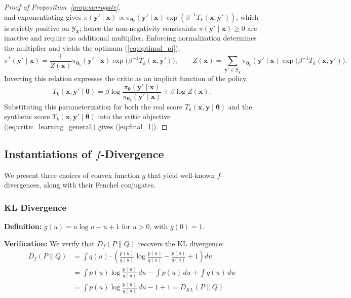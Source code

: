\begin{proof}[Proof of Proposition~\ref{prop:surrogate}]
\[\]
and exponentiating gives $\pi(\boldsymbol{y}'\mid\boldsymbol{x})\propto\pi_{\boldsymbol{\theta}_{k}}(\boldsymbol{y}'\mid\boldsymbol{x})\exp(\beta^{-1}T_{k}(\boldsymbol{x},\boldsymbol{y}'))$, which is strictly positive on $\mathcal{Y}_{\boldsymbol{x}}$; hence the non-negativity constraints $\pi(\boldsymbol{y}'\mid\boldsymbol{x})\ge0$ are inactive and require no additional multiplier. Enforcing normalization determines the multiplier and yields the optimum (\ref{eq:optimal_pi}),
\[
\pi^{*}(\boldsymbol{y}'\mid\boldsymbol{x})=\frac{1}{Z(\boldsymbol{x})}\pi_{\boldsymbol{\theta}_{k}}(\boldsymbol{y}'\mid\boldsymbol{x})\exp\!\big(\beta^{-1}T_{k}(\boldsymbol{x},\boldsymbol{y}')\big),
\qquad
Z(\boldsymbol{x})=\sum_{\boldsymbol{y}'\in\mathcal{Y}_{\boldsymbol{x}}}\pi_{\boldsymbol{\theta}_{k}}(\boldsymbol{y}'\mid\boldsymbol{x})\exp\!\big(\beta^{-1}T_{k}(\boldsymbol{x},\boldsymbol{y}')\big).
\]
Inverting this relation expresses the critic as an implicit function of the policy,
\[
T_{k}(\boldsymbol{x},\boldsymbol{y}'\mid\boldsymbol{\theta})
=\beta\log\frac{\pi_{\boldsymbol{\theta}}(\boldsymbol{y}'\mid\boldsymbol{x})}{\pi_{\boldsymbol{\theta}_{k}}(\boldsymbol{y}'\mid\boldsymbol{x})}+\beta\log Z(\boldsymbol{x}).
\]
Substituting this parameterization for both the real score $T_{k}(\boldsymbol{x},\boldsymbol{y}\mid\boldsymbol{\theta})$ and the synthetic score $T_{k}(\boldsymbol{x},\boldsymbol{y}'\mid\boldsymbol{\theta})$ into the critic objective (\ref{eq:critic_learning_general}) gives (\ref{eq:final_1}).
\end{proof}


\subsection{Instantiations of $f$-Divergence} \label{sec:app:derive f-divergence}

We present three choices of convex function $g$ that yield well-known $f$-divergences, along with their Fenchel conjugates.


\subsubsection{KL Divergence}

\textbf{Definition:} $g(u) = u \log u - u + 1$ for $u > 0$, with $g(0) = 1$.

\textbf{Verification:} We verify that $D_f(P \| Q)$ recovers the KL divergence:
\begin{align*}
D_f(P \| Q) &= \int q(u) \cdot \left( \frac{p(u)}{q(u)} \log \frac{p(u)}{q(u)} - \frac{p(u)}{q(u)} + 1 \right) du \nonumber \\
&= \int p(u) \log \frac{p(u)}{q(u)} \, du - \int p(u) \, du + \int q(u) \, du \nonumber \\
&= \int p(u) \log \frac{p(u)}{q(u)} \, du - 1 + 1 = D_{KL}(P \| Q)
\end{align*}

